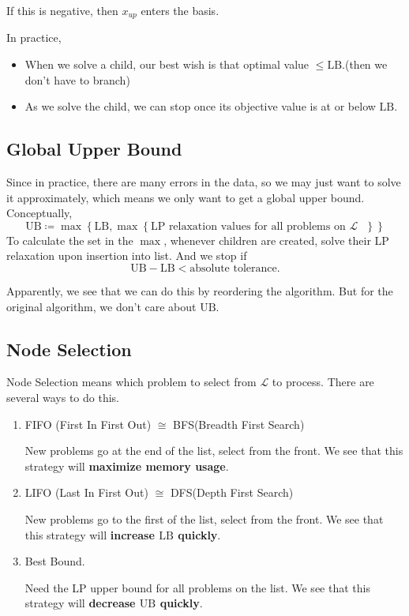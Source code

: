\begin{itemize}
\begin{itemize}
\[		            \]
		            If this is negative, then \(x_{up}\) enters the basis.
	      \end{itemize}
	      \begin{remark}
		      In practice,
		      \begin{itemize}
			      \item When we solve a child, our best wish is that optimal value \(\leq \mathrm{LB}\).(then we don't have to branch)
			      \item As we solve the child, we can stop once its objective value is at or below \(\mathrm{LB} \).
		      \end{itemize}
	      \end{remark}
\end{itemize}

\subsection{Global Upper Bound}
Since in practice, there are many errors in the data, so we may just want to solve it approximately, which means we only want to get a global upper bound.
Conceptually,
\[
	\mathrm{UB} \coloneqq \max\left\{\mathrm{LB}, \max\left\{\text{\(\mathrm{LP}\) relaxation values for all problems on \(\mathcal{L}\) }\right\}\right\}
\]
To calculate the set in the \(\max\), whenever children are created, solve their LP relaxation upon insertion into list. And we stop if
\[
	\mathrm{UB} - \mathrm{LB} < \text{absolute tolerance}.
\]

\begin{remark}
	Apparently, we see that we can do this by reordering the algorithm. But for the original algorithm, we don't care about \(\mathrm{UB}\).
\end{remark}

\subsection{Node Selection}
Node Selection means which problem to select from \(\mathcal{L} \) to process. There are several ways to do this.
\begin{enumerate}
	\item FIFO (First In First Out) \(\cong\) BFS(Breadth First Search)
	      \par New problems go at the end of the list, select from the front. We see that this strategy will \textbf{maximize memory usage}.
	\item LIFO (Last In First Out) \(\cong\) DFS(Depth First Search)
	      \par New problems go to the first of the list, select from the front. We see that this strategy will \textbf{increase \(\mathrm{LB}\) quickly}.
	\item Best Bound.
	      \par Need the LP upper bound for all problems on the list. We see that this strategy will \textbf{decrease \(\mathrm{UB}\) quickly}.
\end{enumerate}

